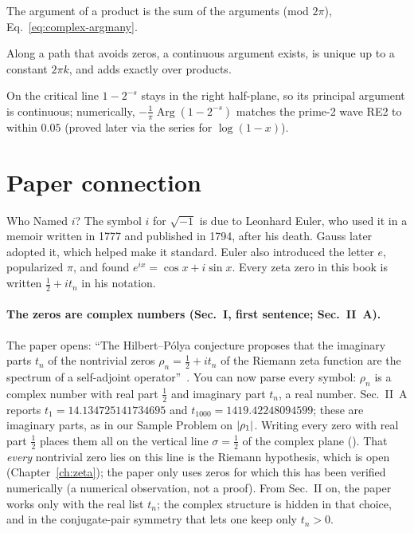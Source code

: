 \begin{keyideas}
\item The argument of a product is the sum of the arguments (mod $2\pi$), Eq.~\eqref{eq:complex-argmany}.
\item Along a path that avoids zeros, a continuous argument exists, is unique up to a constant $2\pi k$, and adds exactly over products.
\item On the critical line $1-2^{-s}$ stays in the right half-plane, so its principal argument is continuous; numerically, $-\frac1\pi\operatorname{Arg}(1-2^{-s})$ matches the prime-2 wave RE2 to within $0.05$ (proved later via the series for $\log(1-x)$).
\end{keyideas}

\section{Paper connection}\label{sec:complex-paper}
\begin{didyouknow}{Who Named $i$?}
The symbol $i$ for $\sqrt{-1}$ is due to Leonhard Euler, who used it in a memoir written in 1777 and published in 1794, after his death. Gauss later adopted it, which helped make it standard. Euler also introduced the letter $e$, popularized $\pi$, and found $e^{ix}=\cos x+i\sin x$. Every zeta zero in this book is written $\tfrac12+it_n$ in his notation.
\end{didyouknow}

\paragraph{The zeros are complex numbers (Sec.~I, first sentence; Sec.~II~A).} The paper opens: ``The Hilbert--P\'olya conjecture proposes that the imaginary parts $t_n$ of the nontrivial zeros $\rho_n=\tfrac12+it_n$ of the Riemann zeta function are the spectrum of a self-adjoint operator''~\cite{soniR1}. You can now parse every symbol: $\rho_n$ is a complex number with real part $\tfrac12$ and imaginary part $t_n$, a real number. Sec.~II~A reports $t_1=14.134725141734695$ and $t_{1000}=1419.42248094599$; these are imaginary parts, as in our Sample Problem on $\left\lvert \rho_1\right\rvert$. Writing every zero with real part $\tfrac12$ places them all on the vertical line $\sigma=\tfrac12$ of the complex plane (). That \emph{every} nontrivial zero lies on this line is the Riemann hypothesis, which is open (Chapter~\ref{ch:zeta}); the paper only uses zeros for which this has been verified numerically (a numerical observation, not a proof). From Sec.~II on, the paper works only with the real list $t_n$; the complex structure is hidden in that choice, and in the conjugate-pair symmetry that lets one keep only $t_n>0$.


